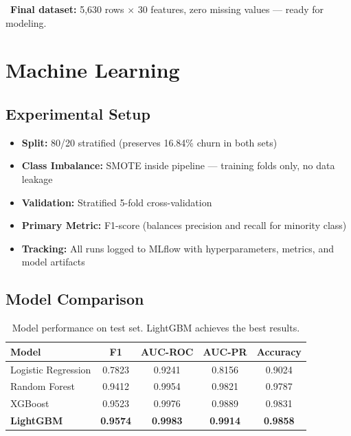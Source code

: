 \documentclass[11pt,a4paper]{article}
\begin{document}
\begin{actionbox}
\faCheckCircle\ \textbf{Final dataset:} 5,630 rows $\times$ 30 features, zero missing values --- ready for modeling.
\end{actionbox}

\section{Machine Learning}

\subsection{Experimental Setup}

\begin{itemize}[leftmargin=*, label=\textcolor{primary}{\faCog}]
    \item \textbf{Split:} 80/20 stratified (preserves 16.84\% churn in both sets)
    \item \textbf{Class Imbalance:} SMOTE inside pipeline --- training folds only, no data leakage
    \item \textbf{Validation:} Stratified 5-fold cross-validation
    \item \textbf{Primary Metric:} F1-score (balances precision and recall for minority class)
    \item \textbf{Tracking:} All runs logged to MLflow with hyperparameters, metrics, and model artifacts
\end{itemize}

\subsection{Model Comparison}

\begin{table}[H]
\centering
\begin{tabular}{l c c c c}
\toprule
\textbf{Model} & \textbf{F1} & \textbf{AUC-ROC} & \textbf{AUC-PR} & \textbf{Accuracy} \\
\midrule
Logistic Regression & 0.7823 & 0.9241 & 0.8156 & 0.9024 \\
Random Forest & 0.9412 & 0.9954 & 0.9821 & 0.9787 \\
XGBoost & 0.9523 & 0.9976 & 0.9889 & 0.9831 \\
\rowcolor{primarylight}
\textbf{LightGBM} & \textbf{0.9574} & \textbf{0.9983} & \textbf{0.9914} & \textbf{0.9858} \\
\bottomrule
\end{tabular}
\caption{Model performance on test set. LightGBM achieves the best results.}
\end{table}
\end{document}
